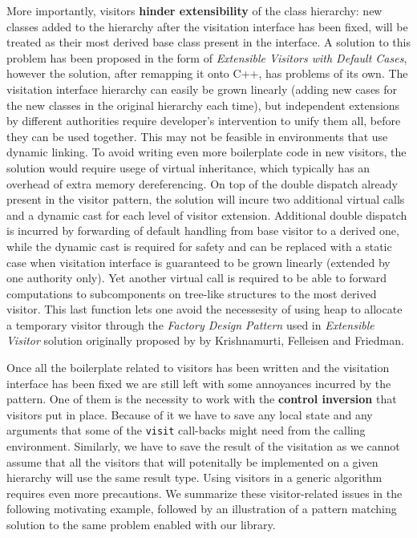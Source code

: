 \documentclass[preprint]{sigplanconf}
\DeclareRobustCommand{\code}[1]{{\lstinline[breaklines=false]{#1}}}
\begin{document}
More importantly, visitors {\bf hinder extensibility} of the class hierarchy: 
new classes added to the hierarchy after the visitation interface has been 
fixed, will be treated as their most derived base class present in the interface.
A solution to this problem has been proposed in the form of \emph{Extensible 
Visitors with Default Cases}\cite[]{Zenger:2001}, however the solution, after 
remapping it onto C++, has problems of its own. The visitation interface 
hierarchy can easily be grown linearly (adding new cases for the new classes in 
the original hierarchy each time), but independent extensions by different  
authorities require developer's intervention to unify them all, before they can 
be used together. This may not be feasible in environments that use dynamic 
linking. To avoid writing even more boilerplate code in new visitors, the 
solution would require usege of virtual inheritance\cite{}, which typically has 
an overhead of extra memory dereferencing. On top of the double dispatch already 
present in the visitor pattern, the solution will incure two additional virtual 
calls and a dynamic cast for each level of visitor extension. Additional double 
dispatch is incurred by forwarding of default handling from base visitor to a 
derived one, while the dynamic cast is required for safety and can be replaced 
with a static case when visitation interface is guaranteed to be grown linearly 
(extended by one authority only). Yet another virtual call is required to be 
able to forward computations to subcomponents on tree-like structures to the 
most derived visitor. This last function lets one avoid the necessesity of using 
heap to allocate a temporary visitor through the \emph{Factory Design 
Pattern}\cite{DesignPatterns1993} used in \emph{Extensible Visitor} solution 
originally proposed by by Krishnamurti, Felleisen and 
Friedman\cite{Krishnamurthi98}.

Once all the boilerplate related to visitors has been written and the visitation 
interface has been fixed we are still left with some annoyances incurred by the 
pattern. One of them is the necessity to work with the {\bf control inversion} 
that visitors put in place. Because of it we have to save any local state and 
any arguments that some of the \code{visit} call-backs might need from the 
calling environment. Similarly, we have to save the result of the visitation 
as we cannot assume that all the visitors that will potenitally be implemented 
on a given hierarchy will use the same result type. Using visitors in a generic 
algorithm requires even more precautions. We summarize these visitor-related 
issues in the following motivating example, followed by an illustration of a 
pattern matching solution to the same problem enabled with our library.
\end{document}
